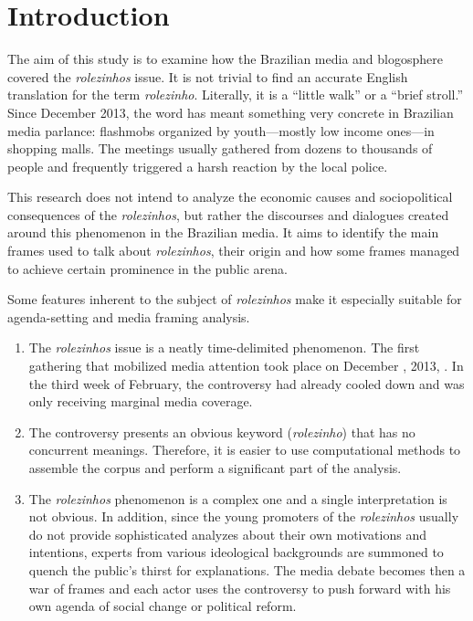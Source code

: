 \chapter{Introduction}

The aim of this study is to examine how the Brazilian media and blogosphere covered the \emph{rolezinhos} issue. It is not trivial to find an accurate English translation for the term \emph{rolezinho}. Literally, it is a \enquote{little walk} or a \enquote{brief stroll.} Since December 2013, the word has meant something very concrete in Brazilian media parlance: flashmobs organized by youth---mostly low income ones---in shopping malls. The meetings usually gathered from dozens to thousands of people and frequently triggered a harsh reaction by the local police.

This research does not intend to analyze the economic causes and sociopolitical consequences of the \emph{rolezinhos}, but rather the discourses and dialogues created around this phenomenon in the Brazilian media. It aims to identify the main frames used to talk about \emph{rolezinhos}, their origin and how some frames managed to achieve certain prominence in the public arena.

Some features inherent to the subject of \emph{rolezinhos} make it especially suitable for agenda-setting and media framing analysis.
\begin{enumerate}
\item The \emph{rolezinhos} issue is a neatly time-delimited phenomenon. The first gathering that mobilized media attention took place on December , 2013, \autocite{folha_arrastao_itaquera, agora_arrastao_itaquera, band_arrastao_itaquera, g1_arrastao_itaquera, terra_arrastao_itaquera, estado_arrastao_itaquera, veja_arrastao_itaquera}. In the third week of February, the controversy had already cooled down and was only receiving marginal media coverage.
\item The controversy presents an obvious keyword (\emph{rolezinho}) that has no concurrent meanings. Therefore, it is easier to use computational methods to assemble the corpus and perform a significant part of the analysis.
\item The \emph{rolezinhos} phenomenon is a complex one and a single interpretation is not obvious. In addition, since the young promoters of the \emph{rolezinhos} usually do not provide sophisticated analyzes about their own motivations and intentions, experts from various ideological backgrounds are summoned to quench the public's thirst for explanations. The media debate becomes then a war of frames and each actor uses the controversy to push forward with his own agenda of social change or political reform.
\end{enumerate}

